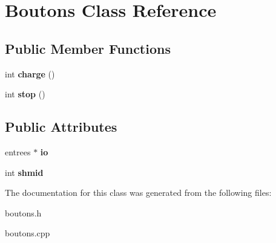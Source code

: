 \hypertarget{classBoutons}{}\section{Boutons Class Reference}
\label{classBoutons}
\subsection*{Public Member Functions}
\begin{DoxyCompactItemize}
\item 
\mbox{\label{classBoutons_a6465c2eecbc7eaf980a73ea370aa9fef}} 
int {\bfseries charge} ()
\item 
\mbox{\label{classBoutons_a47f8f468799107a2c4ad98294f61f007}} 
int {\bfseries stop} ()
\end{DoxyCompactItemize}
\subsection*{Public Attributes}
\begin{DoxyCompactItemize}
\item 
\mbox{\label{classBoutons_a1bbf40857788fdb134e51c746e0279af}} 
entrees $\ast$ {\bfseries io}
\item 
\mbox{\label{classBoutons_aa977a7366ad834b78c1c3f30f7c5ecf7}} 
int {\bfseries shmid}
\end{DoxyCompactItemize}


The documentation for this class was generated from the following files\+:\begin{DoxyCompactItemize}
\item 
boutons.\+h\item 
boutons.\+cpp\end{DoxyCompactItemize}
